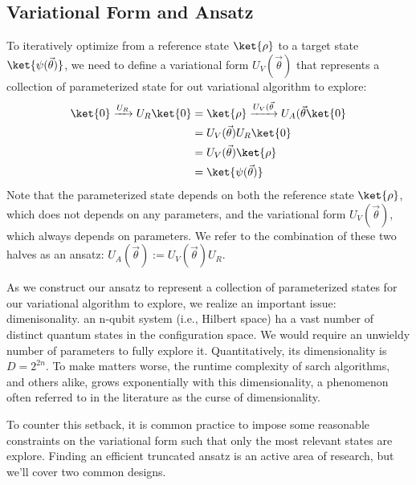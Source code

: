 \documentclass[12pt, oneside]{book}
\theoremstyle{definition}
\theoremstyle{definition}
\theoremstyle{remark}
\begin{document}
\subsection{Variational Form and Ansatz}
To iteratively optimize from a reference state $\ket{\rho}$ to a target state $\ket{\psi(\vec{\theta})}$, we need to define a variational form $U_V(\vec{\theta})$ that represents a collection of parameterized state for out variational algorithm to explore:
\begin{align*}
    \ket{0}\xrightarrow{U_R} U_R\ket{0}&=\ket{\rho}\xrightarrow{U_V(\vec{\theta}}U_A(\vec{\theta}\ket{0}\\
    &=U_V(\vec{\theta})U_R\ket{0}\\
    &=U_V(\vec{\theta})\ket{\rho}\\
    &=\ket{\psi(\vec{\theta})}
\end{align*}
Note that the parameterized state depends on both the reference state $\ket{\rho}$, which does not depends on any parameters, and the variational form $U_V(\vec{\theta})$, which always depends on parameters. We refer to the combination of these two halves as an ansatz: $U_A(\vec{\theta}):=U_V(\vec{\theta})U_R$.

As we construct our ansatz to represent a collection of parameterized states for our variational algorithm to explore, we realize an important issue: dimenisonality. an n-qubit system (i.e., Hilbert space) ha a vast number of distinct quantum states in the configuration space. We would require an unwieldy number of parameters to fully explore it. Quantitatively, its dimensionality is $D=2^{2n}$. To make matters worse, the runtime complexity of sarch algorithms, and others alike, grows exponentially with this dimensionality, a phenomenon often referred to in the literature as the curse of dimensionality.

To counter this setback, it is common practice to impose some reasonable constraints on the variational form such that only the most relevant states are explore. Finding an efficient truncated ansatz is an active area of research, but we'll cover two common designs.
\end{document}
